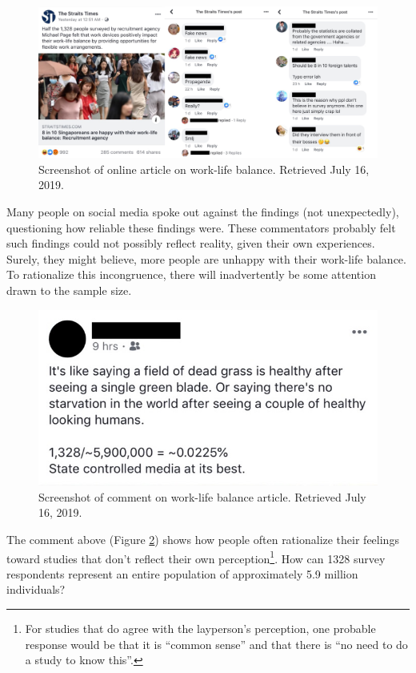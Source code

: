 \documentclass[openany]{book}
\let\rmarkdownfootnote\footnote%
\def\footnote{\protect\rmarkdownfootnote}
\begin{document}
\begin{figure}

{\centering \includegraphics[width=0.9\linewidth]{images/samples/st_worklife} 

}

\caption{Screenshot of online article on work-life balance. Retrieved July 16, 2019.}\label{fig:st-worklife}
\end{figure}

Many people on social media spoke out against the findings (not
unexpectedly), questioning how reliable these findings were. These
commentators probably felt such findings could not possibly reflect
reality, given their own experiences. Surely, they might believe, more
people are unhappy with their work-life balance. To rationalize this
incongruence, there will inadvertently be some attention drawn to the
sample size.

\begin{figure}

{\centering \includegraphics[width=0.6\linewidth]{images/samples/st_samplesize} 

}

\caption{Screenshot of comment on work-life balance article. Retrieved July 16, 2019.}\label{fig:st-samplesize}
\end{figure}

The comment above (Figure \ref{fig:st-samplesize}) shows how people
often rationalize their feelings toward studies that don't reflect their
own perception\footnote{For studies that do agree with the layperson's
  perception, one probable response would be that it is ``common sense''
  and that there is ``no need to do a study to know this''.}. How can
1328 survey respondents represent an entire population of approximately
5.9 million individuals?
\end{document}
